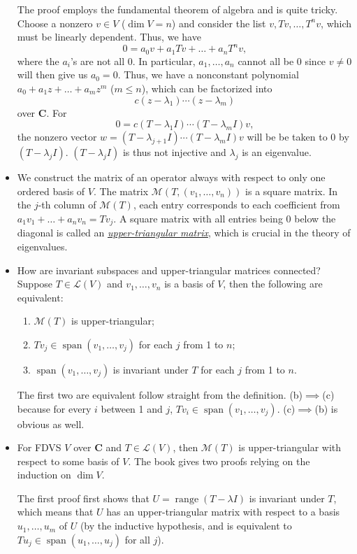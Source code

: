 \documentclass{article}
\newcommand{\df}[1]{\ul{\textit{#1}}}
\newcommand{\C}{\mathbf{C}}
\newcommand{\s}{\operatorname{span}}
\renewcommand{\r}{\operatorname{range}}
\renewcommand{\d}{\dim}
\newcommand{\LV}{\mathcal{L}(V)}
\newcommand{\M}{\mathcal{M}}
\begin{document}
\begin{itemize}
    The proof employs the fundamental theorem of algebra and is quite tricky. Choose a nonzero $v \in V$ ($\d V=n$) and consider the list $v, Tv, \dots, T^n v$, which must be linearly dependent. Thus, we have $$0 = a_0 v + a_1 Tv + \dots + a_n T^n v,$$ where the $a_i$'s are not all $0$. In particular, $a_1, \dots, a_n$ cannot all be 0 since $v \not= 0$ will then give us $a_0 = 0$. Thus, we have a nonconstant polynomial $a_0+a_1 z+\dots+a_m z^m$ ($m \leq n$), which can be factorized into $$c(z - \lambda_1)\cdots(z - \lambda_m)$$ over $\C$. For $$0=c(T - \lambda_1 I)\cdots(T - \lambda_m I)v,$$ the nonzero vector $w = (T - \lambda_{j+1} I) \cdots (T - \lambda_m I)v$ will be be taken to 0 by $(T - \lambda_j I)$. $(T - \lambda_j I)$ is thus not injective and $\lambda_j$ is an eigenvalue.
    \item We construct the matrix of an operator always with respect to only one ordered basis of $V$. The matrix $\M(T,(v_1,\dots,v_n))$ is a square matrix. In the $j$-th column of $\M(T)$, each entry corresponds to each coefficient from $a_1v_1+\dots+a_nv_n = Tv_j$. A square matrix with all entries being 0 below the diagonal is called an \df{upper-triangular matrix}, which is crucial in the theory of eigenvalues.
    \item How are invariant subspaces and upper-triangular matrices connected? Suppose $T \in \LV$ and $v_1,\dots,v_n$ is a basis of $V$, then the following are equivalent:
    \begin{enumerate}[label=(\alph*)]
        \item $\M(T)$ is upper-triangular;
        \item $Tv_j \in \s(v_1,\dots,v_j)$ for each $j$ from 1 to $n$;
        \item $\s(v_1,\dots,v_j)$ is invariant under $T$ for each $j$ from 1 to $n$.
    \end{enumerate}
    The first two are equivalent follow straight from the definition. (b)$\implies$(c) because for every $i$ between 1 and $j$, $Tv_i \in \s(v_1,\dots,v_j)$. (c)$\implies$(b) is obvious as well.
    \item For FDVS $V$ over $\C$ and $T \in \LV$, then $\M(T)$ is upper-triangular with respect to some basis of $V$. The book gives two proofs relying on the induction on $\d V$. 
    
    The first proof first shows that $U = \r(T - \lambda I)$ is invariant under $T$, which means that $U$ has an upper-triangular matrix with respect to a basis $u_1,\dots,u_m$ of $U$ (by the inductive hypothesis, and is equivalent to $Tu_j \in \s(u_1,\dots,u_j)$ for all $j$).
    

\end{itemize}
\end{document}

